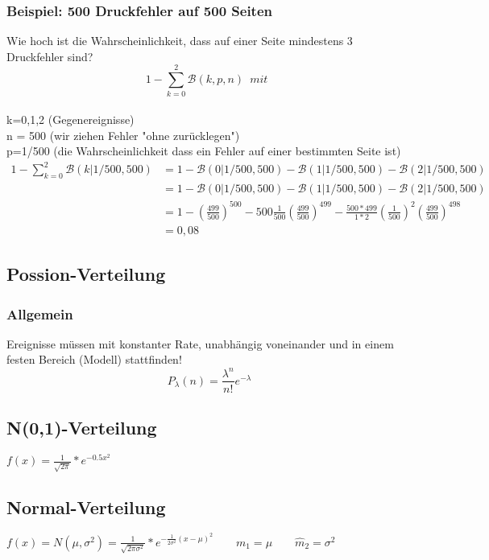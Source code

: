 \documentclass{article}
\begin{document}
	\subsubsection{Beispiel: 500 Druckfehler auf 500 Seiten}
	Wie hoch ist die Wahrscheinlichkeit, dass auf einer Seite mindestens 3 Druckfehler
	sind?
	\[
	1- \sum_{k=0}^{2} \mathcal{B}(k,p,n) \enspace mit \enspace \] \\
	k=0,1,2 (Gegenereignisse)\\ n = 500
	(wir ziehen Fehler "ohne zurücklegen") \\ p=1/500 (die Wahrscheinlichkeit dass
	ein Fehler auf einer bestimmten Seite ist)\\
	\begin{equation*}
	\begin{split}
	1- \sum_{k=0}^{2} \mathcal{B}(k|1/500,500)& = 1 - \mathcal{B}(0|1/500,500) - \mathcal{B}(1|1/500,500) - \mathcal{B}(2|
	1/500,500) \\
	& = 1 -  \mathcal{B}(0|1/500,500) - \mathcal{B}(1|1/500,500) - \mathcal{B}(2|
	1/500,500) \\
	& = 1 - \left( \frac{499}{500} \right) ^{500} - 500\frac{1}{500}\left(\frac{499}{500}\right)^{499} - \frac{500*499}{1*2}\left( \frac{1}{500} \right) ^2 \left( \frac{499}{500} \right) ^{498} \\ & = 0,08
	\end{split}
	\end{equation*}
	\subsection{Possion-Verteilung}
	\subsubsection{Allgemein}
	Ereignisse müssen mit konstanter Rate, unabhängig voneinander und in einem festen 
	Bereich (Modell) stattfinden!
	\[
	P_{\lambda}(n) = \frac{\lambda ^n}{n!} e ^{- \lambda}
	\]
	\subsection{N(0,1)-Verteilung}
	$f(x) = \frac{1}{\sqrt{2\pi}}*e^{-0.5x^2}$
	\subsection{Normal-Verteilung}
	$f(x) = N(\mu, \sigma^2) = \frac{1}{\sqrt{2\pi\sigma^2}}*e^{-\frac{1}{2\sigma^2}(x-		
		\mu)^2} \quad \quad m_1 = \mu \quad \quad \widehat{m}_2=\sigma^2$
\end{document}
